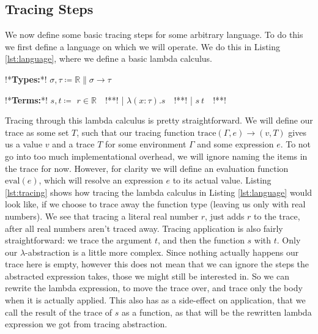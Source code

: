     \subsection{Tracing Steps} \label{sec:steps}
        We now define some basic tracing steps for some arbitrary language.
        To do this we first define a language on which we will operate.
        We do this in Listing \ref{lst:language}, where we define a basic lambda calculus.

        \begin{quicklst}[caption=Basic language, label=lst:language, gobble=12]
            !*\textbf{Types:}*!
                $\sigma,\tau\coloneqq\mathbb{R}\|\sigma\to\tau$

            !*\textbf{Terms:}*!
                $s,t\coloneqq$
                    $r\in\mathbb{R}\quad$!**!
                  | $\lambda(x:\tau).s\quad$!**!
                  | $s\ t\quad$!**!
        \end{quicklst}

        Tracing through this lambda calculus is pretty straightforward.
        We will define our trace as some set $T$, such that our tracing function $\text{trace}(\Gamma,e)\to(v,T)$ gives us a value $v$ and a trace $T$ for some environment $\Gamma$ and some expression $e$.
        To not go into too much implementational overhead, we will ignore naming the items in the trace for now.
        However, for clarity we will define an evaluation function $\text{eval}(e)$, which will resolve an expression $e$ to its actual value.
        Listing \ref{lst:tracing} shows how tracing the lambda calculus in Listing \ref{lst:language} would look like, if we choose to trace away the function type (leaving us only with real numbers).
        We see that tracing a literal real number $r$, just adds $r$ to the trace, after all real numbers aren't traced away.
        Tracing application is also fairly straightforward: we trace the argument $t$, and then the function $s$ with $t$.
        Only our $\lambda$-abstraction is a little more complex.
        Since nothing actually happens our trace here is empty, however this does not mean that we can ignore the steps the abstracted expression takes, those we might still be interested in.
        So we can rewrite the lambda expression, to move the trace over, and trace only the body when it is actually applied.
        This also has as a side-effect on application, that we call the result of the trace of $s$ as a function, as that will be the rewritten lambda expression we got from tracing abstraction.

